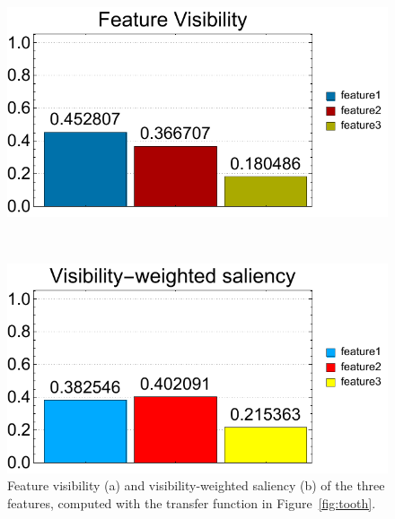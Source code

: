 \begin{figure}
	\centering
	\begin{minipage}{.45\textwidth}
		\includegraphics[width=1\linewidth]{figures/tooth_naive_visibility_chart}
		\subcaption{}
	\end{minipage}~
	\begin{minipage}{.45\textwidth}
		\includegraphics[width=1\linewidth]{figures/tooth_naive_visibility_saliency_weighted_chart}
		\subcaption{}
	\end{minipage}
	\caption[Feature visibility and visibility-weighted saliency of the three features]{Feature visibility \cite{wang_efficient_2011} (a) and visibility-weighted saliency (b) of the three features, computed with the transfer function in Figure~\ref{fig:tooth}.}
	\label{fig:tooth_saliency_chart}
\end{figure}

